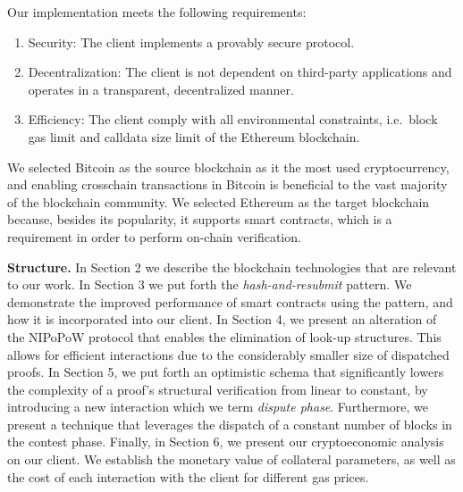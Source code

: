 Our implementation meets the following requirements:
\begin{enumerate}
\item Security: The client implements a provably secure protocol.
\item Decentralization: The client is not dependent on third-party applications
and operates in a transparent, decentralized manner.
\item Efficiency: The client comply with all environmental constraints, i.e.\
block gas limit and calldata size limit of the Ethereum blockchain.
\end{enumerate}

We selected Bitcoin as the source blockchain as it the most used cryptocurrency,
and enabling crosschain transactions in Bitcoin is beneficial to the vast
majority of the blockchain community. We selected Ethereum as the target blockchain
because, besides its popularity, it supports smart contracts, which is a
requirement in order to perform on-chain verification.


\noindent
\textbf{Structure.} In Section 2 we describe the blockchain technologies that
are relevant to our work. In Section 3 we put forth the
\emph{hash-and-resubmit} pattern. We demonstrate the improved performance of
smart contracts using the pattern, and how it is incorporated into our
client. In Section 4, we present an alteration of the NIPoPoW protocol that
enables the elimination of look-up structures. This allows for efficient
interactions due to the considerably smaller size of dispatched proofs. In
Section 5, we put forth an optimistic schema that significantly lowers the
complexity of a proof's structural verification from linear to constant, by
introducing a new interaction which we term \emph{dispute phase}. Furthermore,
we present a technique that leverages the dispatch of a constant number of blocks
in the contest phase. Finally, in Section 6, we present our cryptoeconomic analysis
on our client. We establish the monetary value of collateral parameters, as well
as the cost of each interaction with the client for different gas prices.
